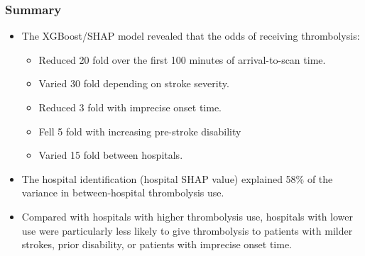 \documentclass{beamer}
\begin{document}
\begin{frame}
\frametitle{Summary}
\small

\begin{itemize}
    \item The XGBoost/SHAP model revealed that the odds of receiving thrombolysis:



    \begin{itemize}
        \item Reduced 20 fold over the first 100 minutes of arrival-to-scan time.
        \item Varied 30 fold depending on stroke severity.
        \item Reduced 3 fold with imprecise onset time.
        \item Fell 5 fold with increasing pre-stroke disability
        \item Varied 15 fold between hospitals. 
    \end{itemize}

\item The hospital identification (hospital SHAP value) explained 58\% of the variance in between-hospital thrombolysis use. 

\item Compared with hospitals with higher thrombolysis use, hospitals with lower use were particularly less likely to give thrombolysis to patients with milder strokes, prior disability, or patients with imprecise onset time.
\end{itemize}

\end{frame}

\end{document}

